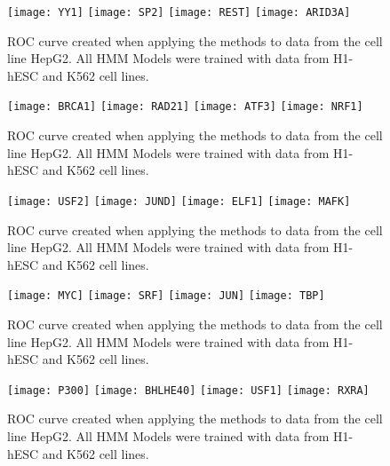 \documentclass[11pt,a4]{article}
\begin{document}
\begin{figure}[h]
\centering
    \texttt{[image: YY1]}
    \texttt{[image: SP2]}
    \texttt{[image: REST]}
    \texttt{[image: ARID3A]}
\caption{ROC curve created when applying the methods to data from the cell line HepG2. All HMM Models were trained with data from H1-hESC and K562 cell lines.}
\label{fig:roc.HepG2.1}
\end{figure}

\begin{figure}[h]
\centering
    \texttt{[image: BRCA1]}
    \texttt{[image: RAD21]}
    \texttt{[image: ATF3]}
    \texttt{[image: NRF1]}
\caption{ROC curve created when applying the methods to data from the cell line HepG2. All HMM Models were trained with data from H1-hESC and K562 cell lines.}
\label{fig:roc.HepG2.2}
\end{figure}

\begin{figure}[h]
\centering
    \texttt{[image: USF2]}
    \texttt{[image: JUND]}
    \texttt{[image: ELF1]}
    \texttt{[image: MAFK]}
\caption{ROC curve created when applying the methods to data from the cell line HepG2. All HMM Models were trained with data from H1-hESC and K562 cell lines.}
\label{fig:roc.HepG2.3}
\end{figure}

\begin{figure}[h]
\centering
    \texttt{[image: MYC]}
    \texttt{[image: SRF]}
    \texttt{[image: JUN]}
    \texttt{[image: TBP]}
\caption{ROC curve created when applying the methods to data from the cell line HepG2. All HMM Models were trained with data from H1-hESC and K562 cell lines.}
\label{fig:roc.HepG2.4}
\end{figure}

\begin{figure}[h]
\centering
    \texttt{[image: P300]}
    \texttt{[image: BHLHE40]}
    \texttt{[image: USF1]}
    \texttt{[image: RXRA]}
\caption{ROC curve created when applying the methods to data from the cell line HepG2. All HMM Models were trained with data from H1-hESC and K562 cell lines.}
\label{fig:roc.HepG2.5}
\end{figure}
\end{document}
